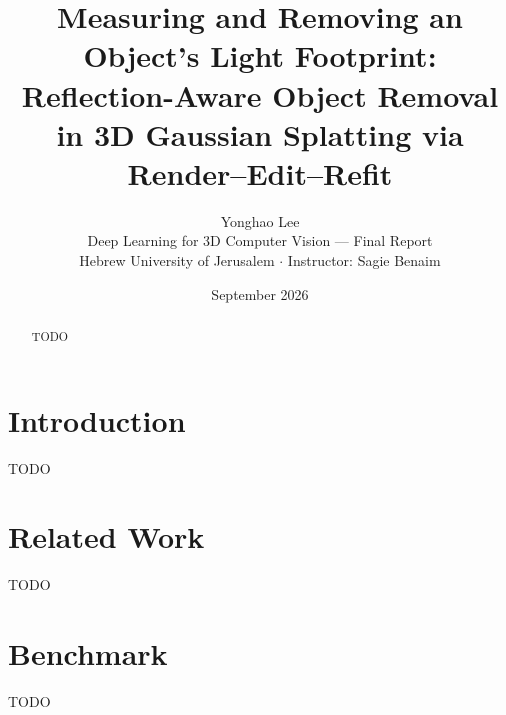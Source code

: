 \documentclass[11pt]{article}
\title{Measuring and Removing an Object's Light Footprint:\\
\large Reflection-Aware Object Removal in 3D Gaussian Splatting via Render--Edit--Refit}
\author{Yonghao Lee\\[2pt]
{\normalsize Deep Learning for 3D Computer Vision --- Final Report}\\
{\normalsize Hebrew University of Jerusalem \quad $\cdot$ \quad Instructor: Sagie Benaim}}
\date{September 2026}
\begin{document}
\maketitle

\begin{abstract}
TODO
\end{abstract}

\section{Introduction}
TODO

\section{Related Work}
TODO

\section{Benchmark}
TODO
\end{document}
